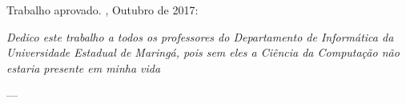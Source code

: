 \documentclass[
    hidelinks,
	12pt,				%
	openany,
	oneside, 
	a4paper,			%
	english,			%
	french,				%
	spanish,			%
	brazil				%
	]{abntex2}
\begin{document}
\begin{folhadeaprovacao}

  \begin{center}
    {\ABNTEXchapterfont\large\imprimirautor}

    \vspace*{\fill}\vspace*{\fill}
    \begin{center}
      \ABNTEXchapterfont\bfseries\Large\imprimirtitulo
    \end{center}
    \vspace*{\fill}
    
    \hspace{.45\textwidth}
    \begin{minipage}{.5\textwidth}
        \imprimirpreambulo
    \end{minipage}%
    \vspace*{\fill}
   \end{center}
        
   Trabalho aprovado. \imprimirlocal, Outubro de 2017:

      
   \begin{center}
    \vspace*{0.5cm}
    {\large\imprimirlocal}
    \par
    {\large\imprimirdata}
    \vspace*{1cm}
  \end{center}
  
\end{folhadeaprovacao}

\begin{dedicatoria}
  \vspace*{\fill}
  \centering
  \noindent
  \textit{Dedico este trabalho a todos os professores do Departamento de Informática da Universidade Estadual de Maringá, pois sem eles a Ciência da Computação não estaria presente em minha vida} \vspace*{\fill}
\end{dedicatoria}
---
\end{document}
